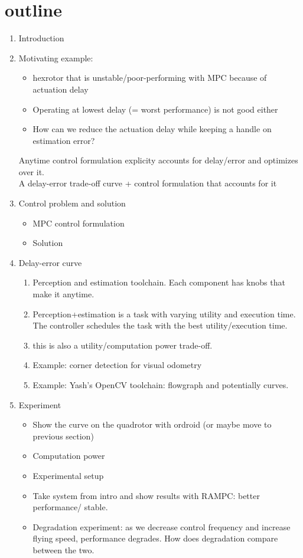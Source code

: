 \section{outline}

\begin{enumerate}
	\item Introduction
	
	\item Motivating example: 
	\begin{itemize}
			\item hexrotor that is unstable/poor-performing with MPC because of actuation delay
			\item Operating at lowest delay (= worst performance) is not good either 
			\item How can we reduce the actuation delay while keeping a handle on estimation error? 			
	\end{itemize}
	Anytime control formulation explicity accounts for delay/error and optimizes over it.
	\\\quad A delay-error trade-off curve + control formulation that accounts for it
	
	\item Control problem and solution
	\begin{itemize}
		\item MPC control formulation 
		\item Solution
	\end{itemize}
	
	
	\item Delay-error curve 
	\begin{enumerate}
		\item Perception and estimation toolchain. Each component has knobs that make it anytime.
		\item Perception+estimation is a task with varying utility and execution time. The controller schedules the task with the best utility/execution time.
		\item this is also a utility/computation power trade-off.
		\item Example: corner detection for visual odometry
		\item Example: Yash's OpenCV toolchain: flowgraph and potentially curves.
	\end{enumerate}
	
	
	\item Experiment
	\begin{itemize}
			\item Show the curve on the quadrotor with ordroid (or maybe move to previous section)
			\item Computation power
			\item Experimental setup
			\item Take system from intro and show results with RAMPC: better performance/ stable.
			\item Degradation experiment: as we decrease control frequency and increase flying speed, performance degrades. How does degradation compare between the two.
			
	\end{itemize}

\end{enumerate}